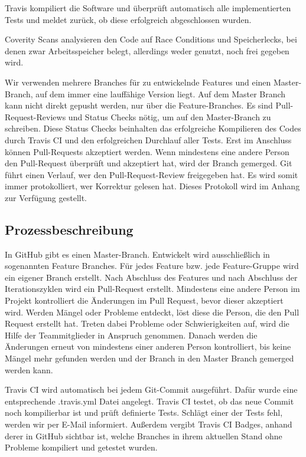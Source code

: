 \documentclass[accentcolor=tud0b,12pt,paper=a4]{tudreport}
\begin{document}
Travis kompiliert die Software und überprüft automatisch alle implementierten Tests und meldet zurück, ob diese erfolgreich abgeschlossen wurden. 

Coverity Scans analysieren den Code auf Race Conditions und Speicherlecks, bei denen zwar Arbeitsspeicher belegt, allerdings weder genutzt, noch frei gegeben wird. 

Wir verwenden mehrere Branches für zu entwickelnde Features und einen Master-Branch, auf dem immer eine lauffähige Version liegt. Auf dem Master Branch kann nicht direkt gepusht werden, nur über die Feature-Branches. Es sind Pull-Request-Reviews und Status Checks nötig, um auf den Master-Branch zu schreiben. Diese Status Checks beinhalten das erfolgreiche Kompilieren des Codes durch Travis CI und den erfolgreichen Durchlauf aller Tests. Erst im Anschluss können Pull-Requests akzeptiert werden. Wenn mindestens eine andere Person den Pull-Request überprüft und akzeptiert hat, wird der Branch gemerged. Git führt einen Verlauf, wer den Pull-Request-Review freigegeben hat. Es wird somit immer protokolliert, wer Korrektur gelesen hat. Dieses Protokoll wird im Anhang zur Verfügung gestellt.


	\subsection{Prozessbeschreibung}
In GitHub gibt es einen Master-Branch. Entwickelt wird ausschließlich in sogenannten Feature Branches. Für jedes Feature bzw. jede Feature-Gruppe wird ein eigener Branch erstellt. Nach Abschluss des Features und nach Abschluss der Iterationszyklen wird ein Pull-Request erstellt. Mindestens eine andere Person im Projekt kontrolliert die Änderungen im Pull Request, bevor dieser akzeptiert wird. Werden Mängel oder Probleme entdeckt, löst diese die Person, die den Pull Request erstellt hat. Treten dabei Probleme oder Schwierigkeiten auf, wird die Hilfe der Teammitglieder in Anspruch genommen. Danach werden die Änderungen erneut von mindestens einer anderen Person kontrolliert, bis keine Mängel mehr gefunden werden und der Branch in den Master Branch gemerged werden kann. 

Travis CI wird automatisch bei jedem Git-Commit ausgeführt. Dafür wurde eine entsprechende .travis.yml Datei angelegt. Travis CI testet, ob das neue Commit noch kompilierbar ist und prüft definierte Tests. Schlägt einer der Tests fehl, werden wir per E-Mail informiert. Außerdem vergibt Travis CI Badges, anhand derer in GitHub sichtbar ist, welche Branches in ihrem aktuellen Stand ohne Probleme kompiliert und getestet wurden. 
\end{document}

